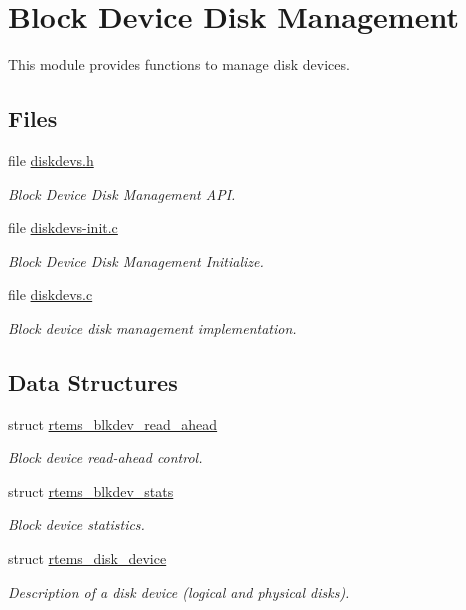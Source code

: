 \hypertarget{group__rtems__disk}{}\section{Block Device Disk Management}
\label{group__rtems__disk}


This module provides functions to manage disk devices.  


\subsection*{Files}
\begin{DoxyCompactItemize}
\item 
file \mbox{\hyperlink{diskdevs_8h}{diskdevs.\+h}}
\begin{DoxyCompactList}\small\item\em Block Device Disk Management A\+PI. \end{DoxyCompactList}\item 
file \mbox{\hyperlink{diskdevs-init_8c}{diskdevs-\/init.\+c}}
\begin{DoxyCompactList}\small\item\em Block Device Disk Management Initialize. \end{DoxyCompactList}\item 
file \mbox{\hyperlink{diskdevs_8c}{diskdevs.\+c}}
\begin{DoxyCompactList}\small\item\em Block device disk management implementation. \end{DoxyCompactList}\end{DoxyCompactItemize}
\subsection*{Data Structures}
\begin{DoxyCompactItemize}
\item 
struct \mbox{\hyperlink{structrtems__blkdev__read__ahead}{rtems\+\_\+blkdev\+\_\+read\+\_\+ahead}}
\begin{DoxyCompactList}\small\item\em Block device read-\/ahead control. \end{DoxyCompactList}\item 
struct \mbox{\hyperlink{structrtems__blkdev__stats}{rtems\+\_\+blkdev\+\_\+stats}}
\begin{DoxyCompactList}\small\item\em Block device statistics. \end{DoxyCompactList}\item 
struct \mbox{\hyperlink{structrtems__disk__device}{rtems\+\_\+disk\+\_\+device}}
\begin{DoxyCompactList}\small\item\em Description of a disk device (logical and physical disks). \end{DoxyCompactList}\end{DoxyCompactItemize}
